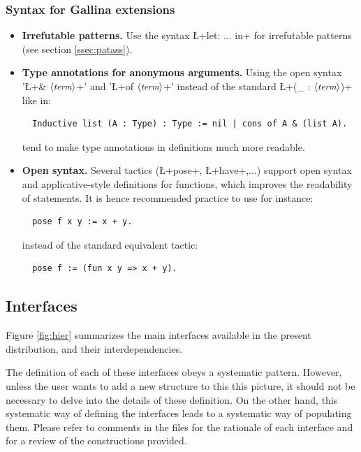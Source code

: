 \subsubsection*{Syntax for Gallina extensions}
\begin{itemize}
\item {\bf Irrefutable patterns.} Use the \ssr{} syntax
\L+let: ... in+ for irrefutable patterns (see section
\ref{ssec:patass}).
\item {\bf Type annotations for anonymous arguments.} Using the open
  \ssr{} syntax '\L+& $\langle\mbox{\itshape\rmfamily\small term}\rangle$+' and '\L+of $\langle\mbox{\itshape\rmfamily\small term}\rangle$+' instead of the
  standard  \L+(_ : $\langle\mbox{\itshape\rmfamily\small term}\rangle$)+ like in:
\begin{lstlisting}
  Inductive list (A : Type) : Type := nil | cons of A & (list A).
\end{lstlisting}
tend to make type annotations in definitions much more readable.
\item{\bf Open syntax.} Several \ssr{} tactics (\L+pose+, \L+have+,...)
  support open syntax and applicative-style definitions for functions,
  which improves the readability of statements.
  It is hence recommended practice to use for instance:
\begin{lstlisting}
  pose f x y := x + y.
\end{lstlisting}
instead of the standard \Coq{} equivalent tactic:
\begin{lstlisting}
  pose f := (fun x y => x + y).
\end{lstlisting}

\end{itemize}

\subsection{Interfaces}

Figure \ref{fig:hier} summarizes the main interfaces available in
the present distribution, and their interdependencies. %

The definition of each of these interfaces obeys a systematic
pattern. However, unless the user wants to add a new structure to this
this picture, it should not be necessary to delve into the details of
these definition. On the other hand, this systematic way of defining
the interfaces leads to a systematic way of populating them. Please
refer to comments in the files for the rationale of each interface and
for a review of the constructions provided.

